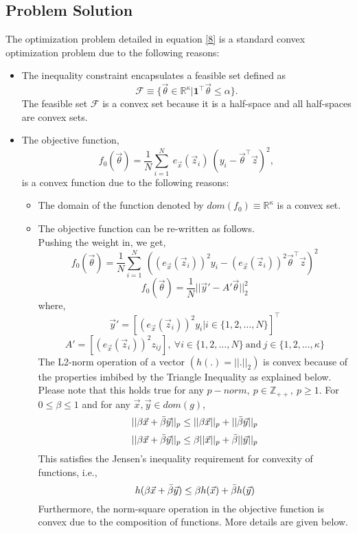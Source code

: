 \documentclass{article}
\begin{document}
\subsection{Problem Solution}
The optimization problem detailed in equation \eqref{8} is a standard convex optimization problem due to the following reasons:
\begin{itemize}
    \item The inequality constraint encapsulates a feasible set defined as \[\mathcal{F} \equiv \{\vec{\theta} \in \mathbb{R}^{\kappa} | \textbf{1}^\intercal \vec{\theta} \leq \alpha\}.\] The feasible set $\mathcal{F}$ is a convex set because it is a half-space and all half-spaces are convex sets.
    \item The objective function,
    \[f_0(\vec{\theta}) = \frac{1}{N} \sum_{i=1}^N\ e_{\vec{x}}(\vec{z}_i)\ (y_i - \vec{\theta}^\intercal \vec{z})^2,\] is a convex function due to the following reasons:
    \begin{itemize}
        \item The domain of the function denoted by $dom(f_0) \equiv \mathbb{R}^{\kappa}$ is a convex set.
        \item The objective function can be re-written as follows.
        \\Pushing the weight in, we get,
        \[f_0(\vec{\theta}) = \frac{1}{N} \sum_{i=1}^N\ ((e_{\vec{x}}(\vec{z}_i))^2 y_{i} - (e_{\vec{x}}(\vec{z}_i))^2 \vec{\theta}^\intercal \vec{z})^2\]
        \[f_0(\vec{\theta}) = \frac{1}{N} ||\vec{y}' - A'\vec{\theta}||_2^{2}\]
        where,
        \[\vec{y}' = [(e_{\vec{x}}(\vec{z}_i))^2 y_i | i \in \{1, 2, \dots, N\}]^\intercal\]
        \[A' = [(e_{\vec{x}}(\vec{z}_i))^2 z_{ij}],\ \forall i \in \{1, 2, \dots, N\}\ \text{and}\ j \in \{1, 2, \dots, \kappa\}\]
        The L2-norm operation of a vector $(h(.) = ||.||_2)$ is convex because of the properties imbibed by the Triangle Inequality as explained below. Please note that this holds true for any $p-norm,\ p \in \mathbb{Z}_{++},\ p \geq 1$.
        For $0 \leq \beta \leq 1$ and for any $\vec{x}, \vec{y} \in dom(g)$,
        \[||\beta \vec{x} + \Bar{\beta} \vec{y}||_p \leq ||\beta \vec{x}||_p + ||\Bar{\beta} \vec{y}||_p\]
        \[||\beta \vec{x} + \Bar{\beta} \vec{y}||_p \leq \beta||\vec{x}||_p + \Bar{\beta}||\vec{y}||_p\]
        This satisfies the Jensen's inequality requirement for convexity of functions, i.e.,
        \[h(\beta \vec{x} + \Bar{\beta} \vec{y}) \leq \beta h(\vec{x}) + \Bar{\beta} h(\vec{y})\]
        Furthermore, the norm-square operation in the objective function is convex due to the composition of functions. More details are given below.

\end{itemize}
\end{itemize}
\end{document}
